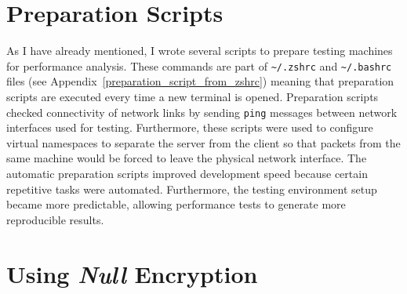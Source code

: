 \documentclass[12pt,a4paper]{report}
\newcommand\note[2]{{\color{#1}\bf #2}}
\newcommand\simon[1]{\ifcomments{\note{cyan}{SM: #1}}\fi}
\begin{document}





















\section{Preparation Scripts}
As I have already mentioned, I wrote several scripts to prepare testing machines for performance analysis.
These commands are part of \texttt{\textasciitilde/.zshrc} and \texttt{\textasciitilde/.bashrc} files (see Appendix~\ref{preparation_script_from_zshrc}) meaning that preparation scripts are executed every time a new terminal is opened.
Preparation scripts checked connectivity of network links by sending \texttt{ping} messages between network interfaces used for testing.
Furthermore, these scripts were used to configure virtual namespaces to separate the server from the client so that packets from the same machine would be forced to leave the physical network interface.
The automatic preparation scripts improved development speed because certain repetitive tasks were automated.
Furthermore, the testing environment setup became more predictable, allowing performance tests to generate more reproducible results.

















\section{Using \textit{Null} Encryption}
\end{document}
